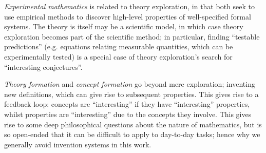 \emph{Experimental mathematics} is related to theory exploration, in that both
seek to use empirical methods to discover high-level properties of
well-specified formal systems. The theory is itself may be a scientific model,
in which case theory exploration becomes part of the scientific method; in
particular, finding ``testable predictions'' (e.g. equations relating measurable
quantities, which can be experimentally tested) is a special case of theory
exploration's search for ``interesting conjectures''.

\emph{Theory formation} and \emph{concept formation} go beyond mere exploration;
inventing new definitions, which can give rise to subsequent properties. This
gives rise to a feedback loop: concepts are ``interesting'' if they have
``interesting'' properties, whilst properties are ``interesting'' due to the
concepts they involve. This gives rise to some deep philosophical questions
about the nature of mathematics, but is so open-ended that it can be difficult
to apply to day-to-day tasks; hence why we generally avoid invention systems
in this work.
